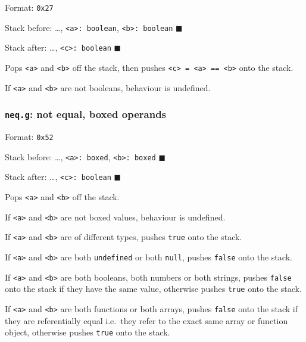 Format: \texttt{0x27}

Stack before: \ldots, \texttt{\textless{}a\textgreater{}:\ boolean},
\texttt{\textless{}b\textgreater{}:\ boolean} \(\blacksquare\)

Stack after: \ldots, \texttt{\textless{}c\textgreater{}:\ boolean}
\(\blacksquare\)

Pops \texttt{\textless{}a\textgreater{}} and
\texttt{\textless{}b\textgreater{}} off the stack, then pushes
\texttt{\textless{}c\textgreater{}\ =\ \textless{}a\textgreater{}\ ==\ \textless{}b\textgreater{}}
onto the stack.

If \texttt{\textless{}a\textgreater{}} and
\texttt{\textless{}b\textgreater{}} are not booleans, behaviour is
undefined.

\subsubsection{\texorpdfstring{\texttt{neq.g}: not equal, boxed
operands}{neq.g: not equal, boxed operands}}

Format: \texttt{0x52}

Stack before: \ldots, \texttt{\textless{}a\textgreater{}:\ boxed},
\texttt{\textless{}b\textgreater{}:\ boxed} \(\blacksquare\)

Stack after: \ldots, \texttt{\textless{}c\textgreater{}:\ boolean}
\(\blacksquare\)

Pops \texttt{\textless{}a\textgreater{}} and
\texttt{\textless{}b\textgreater{}} off the stack.

If \texttt{\textless{}a\textgreater{}} and
\texttt{\textless{}b\textgreater{}} are not boxed values, behaviour is
undefined.

If \texttt{\textless{}a\textgreater{}} and
\texttt{\textless{}b\textgreater{}} are of different types, pushes
\texttt{true} onto the stack.

If \texttt{\textless{}a\textgreater{}} and
\texttt{\textless{}b\textgreater{}} are both \texttt{undefined} or both
\texttt{null}, pushes \texttt{false} onto the stack.

If \texttt{\textless{}a\textgreater{}} and
\texttt{\textless{}b\textgreater{}} are both booleans, both numbers or
both strings, pushes \texttt{false} onto the stack if they have the same
value, otherwise pushes \texttt{true} onto the stack.

If \texttt{\textless{}a\textgreater{}} and
\texttt{\textless{}b\textgreater{}} are both functions or both arrays,
pushes \texttt{false} onto the stack if they are referentially equal
i.e.~they refer to the exact same array or function object, otherwise
pushes \texttt{true} onto the stack.

